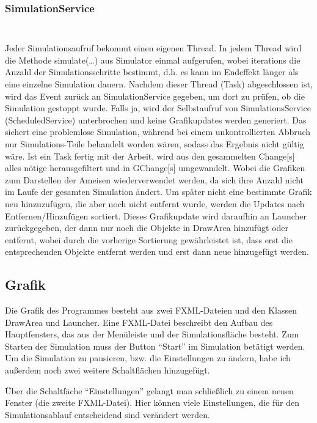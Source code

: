 \documentclass[a4paper,12pt]{scrartcl}
\begin{document}
\subsubsection*{SimulationService}
\begin{lstlisting}

\end{lstlisting}
\begin{lstlisting}

\end{lstlisting}
Jeder Simulationsaufruf bekommt einen eigenen Thread. In jedem Thread wird die Methode simulate(\dots{}) aus Simulator einmal aufgerufen, wobei iterations die Anzahl der Simulationsschritte bestimmt, d.h. es kann im Endeffekt länger als eine einzelne Simulation dauern. Nachdem dieser Thread (Task) abgeschlossen ist, wird das Event zurück an SimulationService gegeben, um dort zu prüfen, ob die Simulation gestoppt wurde. Falls ja, wird der Selbstaufruf von SimulationsService (ScheduledService) unterbrochen und keine Grafikupdates werden generiert. Das sichert eine problemlose Simulation, während bei einem unkontrollierten Abbruch nur Simulations-Teile behandelt worden wären, sodass das Ergebnis nicht gültig wäre.
Ist ein Task fertig mit der Arbeit, wird aus den gesammelten Change[s] alles nötige herausgefiltert und in GChange[s] umgewandelt. Wobei die Grafiken zum Darstellen der Ameisen wiederverwendet werden, da sich ihre Anzahl nicht im Laufe der gesamten Simulation ändert. Um später nicht eine bestimmte Grafik neu hinzuzufügen, die aber noch nicht entfernt wurde, werden die Updates nach Entfernen/Hinzufügen sortiert. Dieses Grafikupdate wird daraufhin an Launcher zurückgegeben, der dann nur noch die Objekte in DrawArea hinzufügt oder entfernt, wobei durch die vorherige Sortierung gewährleistet ist, dass erst die entsprechenden Objekte entfernt werden und erst dann neue hinzugefügt werden.
\subsection*{Grafik}
Die Grafik des Programmes besteht aus zwei FXML-Dateien und den Klassen DrawArea und Launcher.
Eine FXML-Datei beschreibt den Aufbau des Hauptfensters, das aus der Menüleiste und der Simulationsfläche besteht. Zum Starten der Simulation muss der Button "`Start"' im Simulation betätigt werden. Um die Simulation zu pausieren, bzw. die Einstellungen zu ändern, habe ich außerdem noch zwei weitere Schaltflächen hinzugefügt.

Über die Schaltfäche "`Einstellungen"' gelangt man schließlich zu einem neuen Fenster (die zweite FXML-Datei). Hier können viele Einstellungen, die für den Simulationsablauf entscheidend sind verändert werden.
\end{document}
